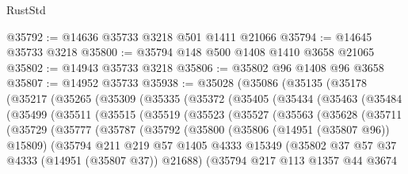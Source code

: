 \begin{lexlean}{RustStd}
\begin{coremodule}
@35792 := @14636 @35733 @3218 @501 @1411 @21066
@35794 := @14645 @35733 @3218
@35800 := @35794 @148 @500 @1408 @1410 @3658 @21065
@35802 := @14943 @35733 @3218
@35806 := @35802 @96 @1408 @96 @3658
@35807 := @14952 @35733
@35938 := @35028
    (@35086
      (@35135
        (@35178
          (@35217
            (@35265
              (@35309
                (@35335
                  (@35372
                    (@35405
                      (@35434
                        (@35463
                          (@35484
                            (@35499
                              (@35511
                                (@35515
                                  (@35519
                                    (@35523
                                      (@35527
                                        (@35563
                                          (@35628
                                            (@35711
                                              (@35729
                                                (@35777
                                                  (@35787
                                                    (@35792
                                                      (@35800
                                                        (@35806 (@14951 (@35807 @96)) @15809)
                                                        (@35794
                                                          @211
                                                          @219
                                                          @57
                                                          @1405
                                                          @4333
                                                          @15349
                                                          (@35802
                                                            @37
                                                            @57
                                                            @37
                                                            @4333
                                                            (@14951 (@35807 @37))
                                                            @21688)
                                                          (@35794
                                                            @217
                                                            @113
                                                            @1357
                                                            @44
                                                            @3674

\end{coremodule}
\end{lexlean}
